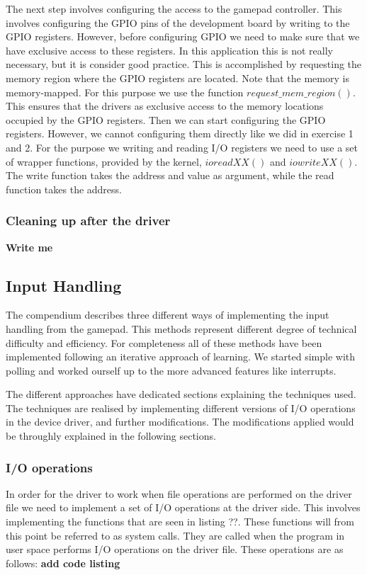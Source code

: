 The next step involves configuring the access to the gamepad controller. This involves configuring the GPIO pins of the development board by writing to the GPIO registers. However, before configuring GPIO we need to make sure that we have exclusive access to these registers. In this application this is not really necessary, but it is consider good practice. This is accomplished by requesting the memory region where the GPIO registers are located. Note that the memory is memory-mapped. For this purpose we use the function $request\_mem\_region()$. This ensures that the drivers as exclusive access to the memory locations occupied by the GPIO registers. Then we can start configuring the GPIO registers. However, we cannot configuring them directly like we did in exercise 1 and 2. For the purpose we writing and reading I/O registers we need to use a set of wrapper functions, provided by the kernel, $ioreadXX()$ and $iowriteXX()$. The write function takes the address and value as argument, while the read function takes the address. 



\subsubsection{Cleaning up after the driver}
{\bf Write me}





\subsection{Input Handling}
The compendium describes three different ways of implementing the input handling from the gamepad. This methods represent different degree of technical difficulty and efficiency. For completeness all of these methods have been implemented following an iterative approach of learning. We started simple with polling and worked ourself up to the more advanced features like interrupts.

The different approaches have dedicated sections explaining the techniques used. The techniques are realised by implementing different versions of I/O operations in the device driver, and further modifications. The modifications applied would be throughly explained in the following sections. 


\subsubsection{I/O operations}
In order for the driver to work when file operations are performed on the driver file we need to implement a set of I/O operations at the driver side. This involves implementing the functions that are seen in listing ??. These functions will from this point be referred to as system calls. They are called when the program in user space performs I/O operations on the driver file. These operations are as follows: {\bf add code listing}

